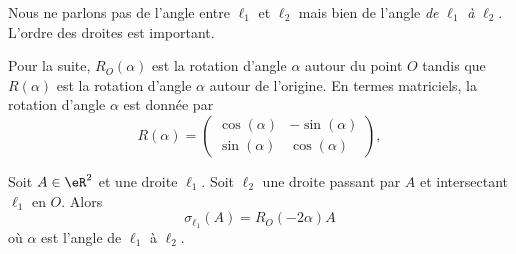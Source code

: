 \begin{remark}
    Nous ne parlons pas de l'angle entre \( \ell_1\) et \( \ell_2\) mais bien de l'angle \emph{de} \( \ell_1\) \emph{à} \( \ell_2\). L'ordre des droites est important.
\end{remark}

\begin{normaltext}
    Pour la suite, \( R_O(\alpha)\) est la rotation d'angle \( \alpha\) autour du point \( O\) tandis que \( R(\alpha)\) est la rotation d'angle \( \alpha\) autour de l'origine. En termes matriciels, la rotation d'angle \( \alpha\) est donnée par
    \begin{equation}        \label{EQooQBEJooAHaBbJ}
        R(\alpha)=\begin{pmatrix}
            \cos(\alpha)    &   -\sin(\alpha)    \\ 
            \sin(\alpha)    &   \cos(\alpha)    
        \end{pmatrix},
    \end{equation}
\end{normaltext}

\begin{lemma}        \label{LEMooJLHGooQIpKIE}
    Soit \( A\in \eR^2\) et une droite \( \ell_1\). Soit \( \ell_2\) une droite passant par \( A\) et intersectant \( \ell_1\) en \( O\). Alors
    \begin{equation}
        \sigma_{\ell_1}(A)=R_O(-2\alpha)A
    \end{equation}
    où \( \alpha\) est l'angle de \( \ell_1\) à \( \ell_2\).
\end{lemma}

